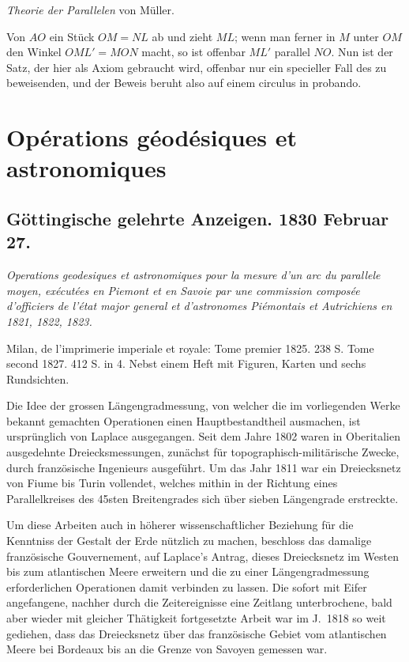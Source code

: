 \documentclass[fontsize=10pt,paper=a5,pagesize,headings=small,headinclude=true,footinclude=true]{scrbook}
\begin{document}
\textit{Theorie der Parallelen} von Müller.

Von $AO$ ein Stück $OM=NL$ ab und zieht $ML$; wenn man ferner in $M$ unter $OM$ den Winkel $OML'=MON$ macht, so ist offenbar $ML'$ parallel $NO$. Nun ist der Satz, der hier als Axiom gebraucht wird, offenbar nur ein specieller Fall des zu beweisenden, und der Beweis beruht also auf einem circulus in probando.

\newpage
\section*{Opérations géodésiques et astronomiques}

\subsection*{Göttingische gelehrte Anzeigen. 1830 Februar 27.}

\textit{Operations geodesiques et astronomiques pour la mesure d'un arc du parallele moyen, exécutées en Piemont et en Savoie par une commission composée d'officiers de l'état major general et d'astronomes Piémontais et Autrichiens en 1821, 1822, 1823.}

Milan, de l'imprimerie imperiale et royale: Tome premier 1825. 238 S. Tome second 1827. 412 S. in 4. Nebst einem Heft mit Figuren, Karten und sechs Rundsichten.

Die Idee der grossen Längengradmessung, von welcher die im vorliegenden Werke bekannt gemachten Operationen einen Hauptbestandtheil ausmachen, ist ursprünglich von Laplace ausgegangen. Seit dem Jahre 1802 waren in Oberitalien ausgedehnte Dreiecksmessungen, zunächst für topographisch-militärische Zwecke, durch französische Ingenieurs ausgeführt. Um das Jahr 1811 war ein Dreiecksnetz von Fiume bis Turin vollendet, welches mithin in der Richtung eines Parallelkreises des 45sten Breitengrades sich über sieben Längengrade erstreckte.

Um diese Arbeiten auch in höherer wissenschaftlicher Beziehung für die Kenntniss der Gestalt der Erde nützlich zu machen, beschloss das damalige französische Gouvernement, auf Laplace's Antrag, dieses Dreiecksnetz im Westen bis zum atlantischen Meere erweitern und die zu einer Längengradmessung erforderlichen Operationen damit verbinden zu lassen. Die sofort mit Eifer angefangene, nachher durch die Zeitereignisse eine Zeitlang unterbrochene, bald aber wieder mit gleicher Thätigkeit fortgesetzte Arbeit war im J.~1818 so weit gediehen, dass das Dreiecksnetz über das französische Gebiet vom atlantischen Meere bei Bordeaux bis an die Grenze von Savoyen gemessen war.
\end{document}
